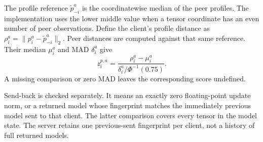 \documentclass[journal]{IEEEtran}
\begin{document}
The profile reference $\widetilde p_{-i}^a$ is the coordinatewise median
of the peer profiles. The implementation uses the lower middle value
when a tensor coordinate has an even number of peer observations.
Define the client's profile distance as
$\rho_i^a=\|p_i^a-\widetilde p_{-i}^a\|_2$. Peer distances are computed
against that same reference. Their median $\mu_i^a$ and MAD $\delta_i^a$
give
\begin{equation}\label{eq:profile-score}
 z_i^{p,a}=\frac{\rho_i^a-\mu_i^a}
                  {\delta_i^a/\Phi^{-1}(0.75)}.
\end{equation}
A missing comparison or zero MAD leaves the corresponding score undefined.

Send-back is checked separately. It means an exactly zero floating-point
update norm, or a returned model whose fingerprint matches the immediately
previous model sent to that client. The latter comparison covers every
tensor in the model state. The server retains one previous-sent fingerprint
per client, not a history of full returned models.
\end{document}

